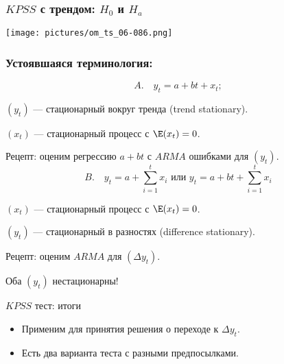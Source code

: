   
  \begin{frame}
    \frametitle{$KPSS$ с трендом: $H_0$ и $H_a$}
    \texttt{[image: pictures/om\_ts\_06-086.png]}
  \end{frame}
  
  \begin{frame}
    \frametitle{Устоявшаяся терминология:}
    \[
      A. \quad y_t = a + bt + x_t;
    \]

    $(y_t)$ — \alert{стационарный вокруг тренда} (trend stationary).

    $(x_t)$ — стационарный процесс с $\E(x_t) = 0$.

    \pause Рецепт: оценим регрессию $a + bt$ с $ARMA$ ошибками для $(y_t)$.
    \pause 
    \[
      B. \quad y_t = a + \sum_{i=1}^t x_i \text{ или } y_t = a + bt + \sum_{i=1}^t x_i
    \]

    $(x_t)$ — стационарный процесс с $\E(x_t) = 0$.

    $(y_t)$ — \alert{стационарный в разностях} (difference stationary).

    \pause Рецепт: оценим $ARMA$ для $(\Delta y_t)$.

    \pause Оба $(y_t)$ нестационарны!
    
  \end{frame}


  
  \begin{frame}{$KPSS$ тест: итоги}
  
    \begin{itemize}[<+->]
      \item Применим для принятия решения о переходе к $\Delta y_t$.
      \item Есть два варианта теста с разными предпосылками.
    \end{itemize}
  \end{frame}
  
  
  
  